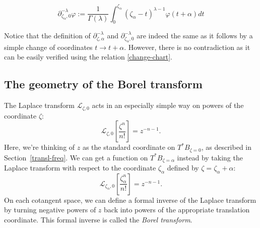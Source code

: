 \documentclass{article}
\theoremstyle{definition}
\newcommand{\fracderiv}[3]{\partial^{#1}_{#2, #3}}
\newcommand{\laplace}{\mathcal{L}}
\begin{document}
\begin{equation}
    \partial_{\zeta_\alpha,0}^{-\lambda}\varphi:=\frac{1}{\Gamma(\lambda)}\int_{0}^{\zeta_\alpha}(\zeta_\alpha-t)^{\lambda-1} \varphi(t+\alpha) dt
\end{equation}

Notice that the definition of $\fracderiv{-\lambda}{\zeta}{\alpha}$ and $\fracderiv{-\lambda}{\zeta_\alpha}{0}$ are indeed the same as it follows by a simple change of coordinates $t\to t+\alpha$. However, there is no contradiction as it can be easily verified using the relation \eqref{change-chart}. 






\subsection{The geometry of the Borel transform}
The Laplace transform $\laplace_{\zeta, 0}$ acts in an especially simple way on powers of the coordinate $\zeta$:
\[ \laplace_{\zeta, 0}\left[\frac{\zeta^n}{n!}\right] = z^{-n-1}. \]
Here, we're thinking of $z$ as the standard coordinate on $T^*B_{\zeta = 0}$, as described in Section~\ref{transl-freq}. We can get a function on $T^*B_{\zeta = \alpha}$ instead by taking the Laplace transform with respect to the coordinate $\zeta_\alpha$ defined by $\zeta = \zeta_\alpha + \alpha$:
\[ \laplace_{\zeta_\alpha, 0}\left[\frac{\zeta_\alpha^n}{n!}\right] = z^{-n-1}. \]
On each cotangent space, we can define a formal inverse of the Laplace transform by turning negative powers of $z$ back into powers of the appropriate translation coordinate. This formal inverse is called the {\em Borel transform}.
\end{document}
